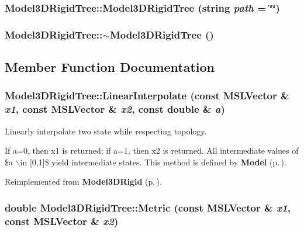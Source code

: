 \subsubsection{\setlength{\rightskip}{0pt plus 5cm}Model3DRigid\-Tree::Model3DRigid\-Tree (string {\em path} = \char`\"{}\char`\"{})}\label{classModel3DRigidTree_a0}


\subsubsection{\setlength{\rightskip}{0pt plus 5cm}Model3DRigid\-Tree::$\sim$Model3DRigid\-Tree ()\hspace{0.3cm}{\tt  [inline, virtual]}}\label{classModel3DRigidTree_a1}




\subsection{Member Function Documentation}
\subsubsection{ Model3DRigid\-Tree::Linear\-Interpolate (const {\bf MSLVector} \& {\em x1}, const {\bf MSLVector} \& {\em x2}, const double \& {\em a})\hspace{0.3cm}{\tt  [virtual]}}\label{classModel3DRigidTree_a4}


Linearly interpolate two state while respecting topology.

If a=0, then x1 is returned; if a=1, then x2 is returned. All intermediate values of \$a $\backslash$in [0,1]\$ yield intermediate states. This method is defined by {\bf Model} {\rm (p.\,\pageref{classModel})}. 

Reimplemented from {\bf Model3DRigid} {\rm (p.\,\pageref{classModel3DRigid_a5})}.
\subsubsection{\setlength{\rightskip}{0pt plus 5cm}double Model3DRigid\-Tree::Metric (const {\bf MSLVector} \& {\em x1}, const {\bf MSLVector} \& {\em x2})\hspace{0.3cm}{\tt  [virtual]}}\label{classModel3DRigidTree_a5}


